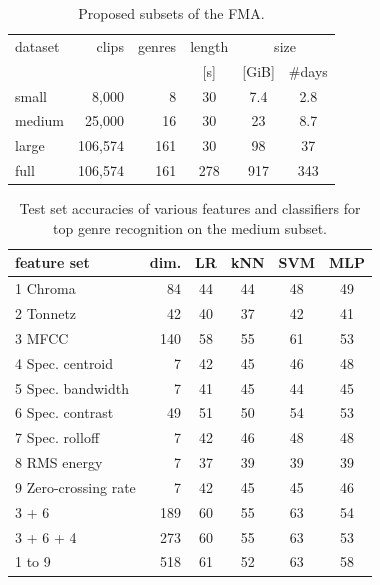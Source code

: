 \documentclass{article}
\newcommand{\ntracks}{106,574 }
\newcommand{\tduration}{343 }
\newcommand{\aduration}{278 }
\newcommand{\size}{917 }
\newcommand{\tspaceb}{\hspace{0.9em}}
\begin{document}
\begin{table}
	\small
	\centering
	\begin{tabular}{lrrccc}
		\toprule
		dataset & clips & genres & length & \multicolumn{2}{c}{size} \\
		\cmidrule{5-6}
		        &       &        &  [s]   & [GiB] & \#days \\
		\midrule
		small  &    8,000 &   8 &  30 &  7.4 & 2.8  \\
		medium &   25,000 &  16 &  30 & 23   & 8.7  \\
		large  & \ntracks & 161 &  30 & 98   & 37 \\
		full   & \ntracks & 161 & \aduration & \size & \tduration  \\
		\bottomrule
	\end{tabular}
	\caption{Proposed subsets of the FMA.}
	\label{tab:subsets}
\end{table}

\begin{table}
	\small
	\centering
	\begin{tabular}{l@{\tspaceb}r@{\tspaceb}c@{\tspaceb}c@{\tspaceb}c@{\tspaceb}c}
		\toprule
		feature set & dim. & LR & kNN & SVM & MLP \\
		\midrule
		1 Chroma~\cite{chroma} & 84 & 44 & 44 & 48 & 49 \\
		2 Tonnetz~\cite{tonnetz} & 42 & 40 & 37 & 42 & 41 \\
		3 MFCC~\cite{mfcc} & 140 & 58 & 55 & 61 & 53 \\
		4 Spec. centroid & 7 & 42 & 45 & 46 & 48 \\
		5 Spec. bandwidth & 7 & 41 & 45 & 44 & 45\\
		6 Spec. contrast~\cite{contrast} & 49 & 51 & 50 & 54 & 53 \\
		7 Spec. rolloff & 7 & 42 & 46 & 48 & 48 \\
		8 RMS energy & 7 & 37 & 39 & 39 & 39 \\ %
		9 Zero-crossing rate & 7 & 42 & 45 & 45 & 46 \\
		\midrule
		3 + 6 & 189 & 60 & 55 & 63 & 54 \\
		3 + 6 + 4 & 273 & 60 & 55 & 63 & 53 \\
		1 to 9 & 518 & 61 & 52 & 63 & 58 \\
		\bottomrule
	\end{tabular}
	\caption{Test set accuracies of various features and classifiers for top genre recognition on the medium subset.}
	\label{tab:mgr}
	\label{tab:features}
\end{table}
\end{document}
